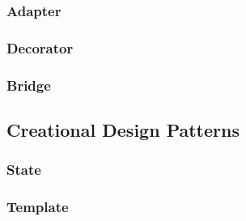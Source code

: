 \subsubsection{Adapter}

\subsubsection{Decorator}

\subsubsection{Bridge}

\subsection{Creational Design Patterns}

\subsubsection{State}

\subsubsection{Template}

